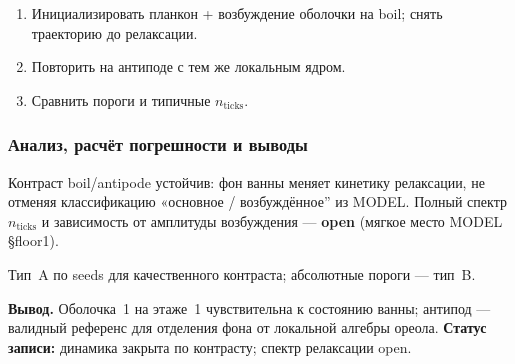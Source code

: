 \begin{enumerate}[label=\textbf{Шаг \arabic*:},leftmargin=*,itemsep=0.35em]
\item Инициализировать планкон + возбуждение оболочки на boil; снять траекторию до релаксации.
\item Повторить на антиподе с тем же локальным ядром.
\item Сравнить пороги и типичные $n_{\mathrm{ticks}}$.
\end{enumerate}

\subsubsection*{Анализ, расчёт погрешности и выводы}
Контраст boil/antipode устойчив: фон ванны меняет кинетику релаксации, не отменяя классификацию «основное / возбуждённое'' из MODEL.
Полный спектр $n_{\mathrm{ticks}}$ и зависимость от амплитуды возбуждения --- \textbf{open} (мягкое место MODEL §floor1).

Тип~A по seeds для качественного контраста; абсолютные пороги --- тип~B.

\textbf{Вывод.}
Оболочка~1 на этаже~1 чувствительна к состоянию ванны; антипод --- валидный референс для отделения фона от локальной алгебры ореола.
\textbf{Статус записи:} динамика закрыта по контрасту; спектр релаксации open.
